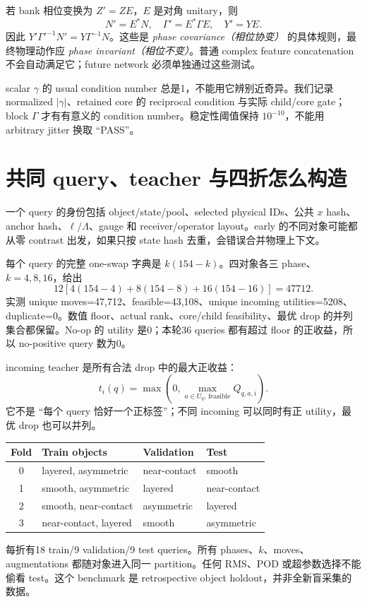 \documentclass[UTF8,11pt,a4paper,fontset=fandol]{ctexart}
\begin{document}
若 bank 相位变换为 $Z'=ZE$，$E$ 是对角 unitary，则
\[
 N'=E^*N,\quad \Gamma'=E^*\Gamma E,\quad Y'=YE.
\]
因此 $Y'\Gamma'^{-1}N'=Y\Gamma^{-1}N$。这些是 \emph{phase covariance（相位协变）} 的具体规则，最终物理动作应 \emph{phase invariant（相位不变）}。普通 complex feature concatenation 不会自动满足它；future network 必须单独通过这些测试。

scalar $\gamma$ 的 usual condition number 总是1，不能用它辨别近奇异。我们记录 normalized $|\gamma|$、retained core 的 reciprocal condition 与实际 child/core gate；block $\Gamma$ 才有有意义的 condition number。稳定性阈值保持 $10^{-10}$，不能用 arbitrary jitter 换取 ``PASS''。

\section{共同 query、teacher 与四折怎么构造}
一个 query 的身份包括 object/state/pool、selected physical IDs、公共 $x$ hash、anchor hash、$\ell/\Lambda$、gauge 和 receiver/operator layout。early 的不同对象可能都从零 contrast 出发，如果只按 state hash 去重，会错误合并物理上下文。

每个 query 的完整 one-swap 字典是 $k(154-k)$。四对象各三 phase、$k=4,8,16$，给出
\[
 12[4(154-4)+8(154-8)+16(154-16)]=47712.
\]
实测 unique moves=47,712、feasible=43,108、unique incoming utilities=5208、duplicate=0。数值 floor、actual rank、core/child feasibility、最优 drop 的并列集合都保留。No-op 的 utility 是0；本轮36 queries 都有超过 floor 的正收益，所以 no-positive query 数为0。

incoming teacher 是所有合法 drop 中的最大正收益：
\[
 t_i(q)=\max(0,\max_{a\in U_q,\,\mathrm{feasible}}Q_{q,a,i}).
\]
它不是 ``每个 query 恰好一个正标签''；不同 incoming 可以同时有正 utility，最优 drop 也可以并列。

\begin{center}\small\begin{tabular}{clll}\toprule
Fold & Train objects & Validation & Test\\\midrule
0 & layered, asymmetric & near-contact & smooth\\
1 & smooth, asymmetric & layered & near-contact\\
2 & smooth, near-contact & asymmetric & layered\\
3 & near-contact, layered & smooth & asymmetric\\\bottomrule
\end{tabular}\end{center}
每折有18 train/9 validation/9 test queries。所有 phases、$k$、moves、augmentations 都随对象进入同一 partition。任何 RMS、POD 或超参数选择不能偷看 test。这个 benchmark 是 retrospective object holdout，并非全新盲采集的数据。
\end{document}
